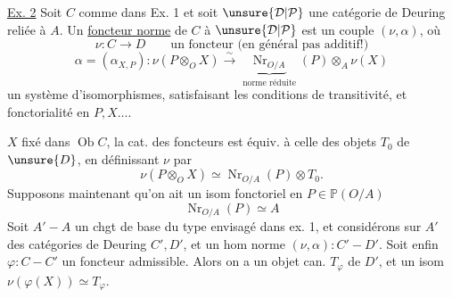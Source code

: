\uline{Ex. 2} Soit $C$ comme dans Ex. 1 et soit $\unsure{\mathcal D|\mathcal P}$ une catégorie de Deuring reliée à $A$. Un \uline{foncteur norme} de $C$ à $\unsure{\mathcal D|\mathcal P}$ est un couple $(\nu,\alpha)$, où
\[
\nu:C\longrightarrow D\qquad\text{un foncteur (en général pas additif!)}
\]
\[
\alpha=(\alpha_{X,P}):\nu(P\otimes_O X)\xrightarrow{\sim}
\underbrace{\operatorname{Nr}_{O/A}}_{\text{norme réduite}}(P)\otimes_A\nu(X)
\]
un système d'isomorphismes, satisfaisant les conditions de transitivité, et fonctorialité en $P,X\ldots$.


  $X$ fixé dans $\operatorname{Ob}C$, la cat. des foncteurs  est  équiv.  à celle des objets $T_0$ de $\unsure{D}$, en définissant $\nu$ par
\[
\nu(P\otimes_O X)\simeq\operatorname{Nr}_{O/A}(P)\otimes T_0.
\]
Supposons maintenant qu'on ait un isom fonctoriel en $P\in\mathbb P(O/A)$
\[
\operatorname{Nr}_{O/A}(P)\simeq A
\]
Soit $A'\mathbin{-}A$ un chgt de base du type envisagé dans ex. 1, et considérons  sur $A'$ des catégories de Deuring $C',D'$, et un hom norme $(\nu,\alpha):C'\mathbin{-}D'$. Soit enfin $\varphi:C\mathbin{-}C'$ un foncteur admissible.
Alors  on a un objet can. $T_\varphi$ de $D'$, et un isom $\nu(\varphi(X))\simeq T_\varphi$.
